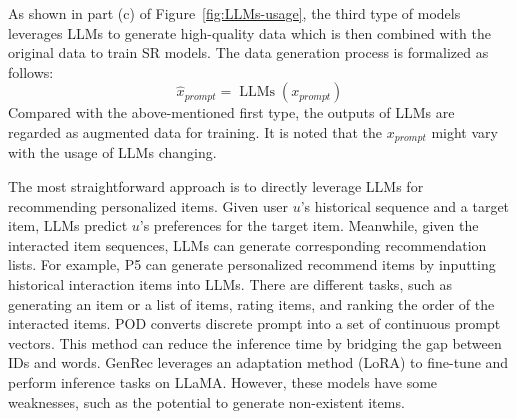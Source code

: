 \documentclass[review]{fcs}
\begin{document}
	As shown in part (c) of Figure~\ref{fig:LLMs-usage}, the third type of models leverages LLMs to generate high-quality data which is then combined with the original data to train SR models. The data generation process is formalized as follows:
	\begin{equation}
		\hat{x}_{prompt} = \operatorname{LLMs}(x_{prompt})
	\end{equation}
	Compared with the above-mentioned first type, the outputs of LLMs are regarded as augmented data for training. It is noted that the $x_{prompt}$ might vary with the usage of LLMs changing.
	
	The most straightforward approach is to directly leverage LLMs for recommending personalized items. Given user $u$'s historical sequence and a target item, LLMs predict $u$'s preferences for the target item. Meanwhile, given the interacted item sequences, LLMs can generate corresponding recommendation lists. For example, P5 \cite{P5} can generate personalized recommend items by inputting historical interaction items into LLMs. There are different tasks, such as generating an item or a list of items, rating items, and ranking the order of the interacted items. POD\cite{POD} converts discrete prompt into a set of continuous prompt vectors. This method can reduce the inference time by bridging the gap between IDs and words. GenRec \cite{GenRec} leverages an adaptation method (LoRA) to fine-tune and perform inference tasks on LLaMA. However, these models have some weaknesses, such as the potential to generate non-existent items.
\end{document}
